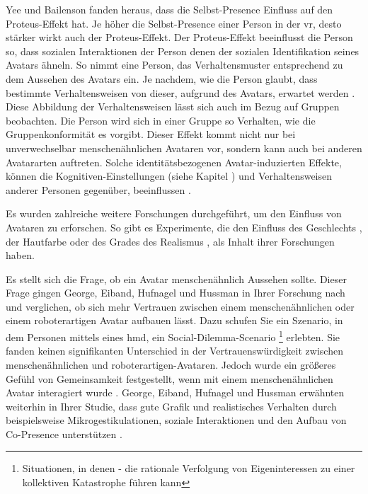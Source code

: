 \documentclass[a4paper,11pt]{article}%
\renewcommand{\\}{\vspace*{0.5\baselineskip} \newline}
\begin{document}
Yee und Bailenson fanden heraus, dass die Selbst-Presence Einfluss auf den Proteus-Effekt hat. Je höher die Selbst-Presence einer Person in der \ac{vr}, desto stärker wirkt auch der Proteus-Effekt. Der Proteus-Effekt beeinflusst die Person so, dass sozialen Interaktionen der Person denen der sozialen Identifikation seines Avatars ähneln. So nimmt eine Person, das Verhaltensmuster entsprechend zu dem Aussehen des Avatars ein. Je nachdem, wie die Person glaubt, dass bestimmte Verhaltensweisen von dieser, aufgrund des Avatars, erwartet werden \citep{ratan2015leveling}.
Diese Abbildung der Verhaltensweisen lässt sich auch im Bezug auf Gruppen beobachten. Die Person wird sich in einer Gruppe so Verhalten, wie die Gruppenkonformität es vorgibt.
Dieser Effekt kommt nicht nur bei unverwechselbar menschenähnlichen Avataren vor, sondern kann auch bei anderen Avatararten auftreten. Solche identitätsbezogenen Avatar-induzierten Effekte, können die \dq{}Kognitiven-Einstellungen\dq{} (siehe Kapitel \textit{}) und Verhaltensweisen anderer Personen gegenüber, beeinflussen \citep{lok2003effects}.

Es wurden zahlreiche weitere Forschungen durchgeführt, um den Einfluss von Avataren zu erforschen. So gibt es Experimente, die den Einfluss des Geschlechts \cite{slater2010first}, der Hautfarbe \cite{peck2013putting} oder des Grades des Realismus \cite{roth2016avatar}, als Inhalt ihrer Forschungen haben.

Es stellt sich die Frage, ob ein Avatar menschenähnlich Aussehen sollte. Dieser Frage gingen George, Eiband, Hufnagel und Hussman \cite{george2018trusting} in Ihrer Forschung nach und verglichen, ob sich mehr Vertrauen zwischen einem menschenähnlichen oder einem roboterartigen Avatar aufbauen lässt.
Dazu schufen Sie ein Szenario, in dem Personen mittels eines \ac{hmd}, ein Social-Dilemma-Scenario \footnote{Situationen, in denen - die rationale Verfolgung von Eigeninteressen zu einer kollektiven Katastrophe führen kann} erlebten. Sie fanden keinen signifikanten Unterschied in der Vertrauenswürdigkeit zwischen menschenähnlichen und roboterartigen-Avataren. Jedoch wurde ein größeres Gefühl von Gemeinsamkeit festgestellt, wenn mit einem menschenähnlichen Avatar interagiert wurde \citep{kerr1983motivation}.
George, Eiband, Hufnagel und Hussman erwähnten weiterhin in Ihrer Studie, dass gute Grafik und realistisches Verhalten durch beispielsweise Mikrogestikulationen, soziale Interaktionen und den Aufbau von \dq{}Co-Presence\dq{} unterstützen \citep{george2018trusting}.
\end{document}
